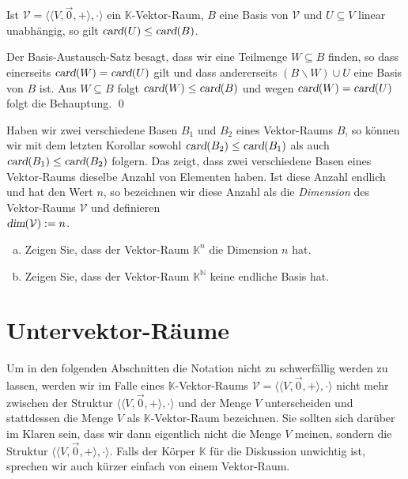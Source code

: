 \begin{Korollar}
  Ist $\mathcal{V} = \bigl\langle \langle V, \vec{0}, + \rangle, \cdot \bigr\rangle$ ein $\mathbb{K}$-Vektor-Raum, $B$ eine Basis von $\mathcal{V}$ und $U \subseteq V$ linear unabh\"{a}ngig,
  so gilt $\textsl{card}(U) \leq \textsl{card}(B)$.
\end{Korollar}

\proof
Der Basis-Austausch-Satz besagt, dass wir eine Teilmenge $W \subseteq B$ finden, so dass einerseits 
$\textsl{card}(W) = \textsl{card}(U)$ gilt und dass andererseits $(B\backslash W) \cup U$ eine Basis
von $B$ ist.  Aus $W \subseteq B$ folgt $\textsl{card}(W) \leq \textsl{card}(B)$ und 
wegen $\textsl{card}(W) = \textsl{card}(U)$ folgt die Behauptung. \qed

Haben wir zwei verschiedene Basen $B_1$ und $B_2$ eines Vektor-Raums $B$, so k\"{o}nnen wir mit dem letzten Korollar sowohl
$\textsl{card}(B_2) \leq \textsl{card}(B_1)$ als auch $\textsl{card}(B_1) \leq \textsl{card}(B_2)$ folgern.   Das zeigt,
dass zwei verschiedene Basen eines Vektor-Raums dieselbe Anzahl von Elementen haben. 
Ist diese Anzahl endlich und hat den Wert $n$, so bezeichnen wir diese Anzahl als die
\emph{\color{blue}Dimension} des Vektor-Raums $\mathcal{V}$ und definieren 
\\[0.2cm]
\hspace*{1.3cm}
$\textsl{dim}(\mathcal{V}) := n$.

\exercise
\begin{enumerate}[(a)]
\item Zeigen Sie, dass der Vektor-Raum $\mathbb{K}^n$ die Dimension $n$ hat. 
\item Zeigen Sie, dass der Vektor-Raum $\mathbb{K}^\mathbb{N}$ keine endliche Basis hat.  \eoxs
\end{enumerate}


\section{Untervektor-R\"{a}ume}
\remark
Um in den folgenden Abschnitten die Notation nicht zu schwerf\"{a}llig werden zu lassen, werden wir im Falle eines
$\mathbb{K}$-Vektor-Raums $\mathcal{V} = \bigl\langle \langle V, \vec{0}, + \rangle, \cdot \bigr\rangle$ 
nicht mehr zwischen der Struktur $\bigl\langle \langle V, \vec{0}, + \rangle, \cdot \bigr\rangle$
und der Menge $V$ unterscheiden und stattdessen die Menge $V$ als $\mathbb{K}$-Vektor-Raum bezeichnen.  Sie
sollten sich dar\"{u}ber im Klaren sein, dass wir dann eigentlich nicht die Menge $V$ meinen, sondern
die Struktur $\bigl\langle \langle V, \vec{0}, + \rangle, \cdot \bigr\rangle$.  Falls der K\"{o}rper
$\mathbb{K}$ f\"{u}r die Diskussion unwichtig  ist, sprechen wir auch k\"{u}rzer einfach von einem Vektor-Raum.
\eoxs

